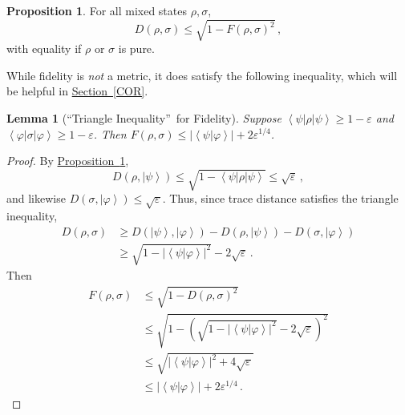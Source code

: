 \documentclass[10pt]{article}
\newtheorem{lemma}[theorem]{Lemma}
\theoremstyle{definition}
\newtheorem{proposition}[theorem]{Proposition}
\numberwithin{equation}{section}
\newcommand{\expref}[2]{\texorpdfstring{\hyperref[#2]{#1~\ref{#2}}}{#1~\ref{#2}}}
\begin{document}
\begin{proposition}
\label{ineq}For all mixed states $\rho,\sigma$,%
\[
D\left(  \rho,\sigma\right)  \leq\sqrt{1-F\left(  \rho,\sigma\right)  ^{2}}\,,
\]
with equality if $\rho$ or $\sigma$ is pure.
\end{proposition}

While fidelity is \emph{not} a metric, it does satisfy the following
inequality, which will be helpful in \expref{Section}{COR}.

\begin{lemma}
[\textquotedblleft Triangle Inequality\textquotedblright\ for Fidelity]%
\label{triangle}Suppose $\left\langle \psi\right\vert \rho\left\vert
\psi\right\rangle \geq1-\varepsilon$ and $\left\langle \varphi\right\vert
\sigma\left\vert \varphi\right\rangle \geq1-\varepsilon$. Then $F\left(
\rho,\sigma\right)  \leq\left\vert \left\langle \psi|\varphi\right\rangle
\right\vert +2\varepsilon^{1/4}$.
\end{lemma}

\begin{proof}
By \expref{Proposition}{ineq},%
\[
D\left(  \rho,\left\vert \psi\right\rangle \right)  \leq\sqrt{1-\left\langle
\psi\right\vert \rho\left\vert \psi\right\rangle }\leq\sqrt{\varepsilon}\,,
\]
and likewise $D\left(  \sigma,\left\vert \varphi\right\rangle \right)
\leq\sqrt{\varepsilon}$. Thus, since trace distance satisfies the triangle
inequality,%
\begin{align*}
D\left(  \rho,\sigma\right)   &  \geq D\left(  \left\vert \psi\right\rangle
,\left\vert \varphi\right\rangle \right)  -D\left(  \rho,\left\vert
\psi\right\rangle \right)  -D\left(  \sigma,\left\vert \varphi\right\rangle
\right)  \\
&  \geq\sqrt{1-\left\vert \left\langle \psi|\varphi\right\rangle \right\vert
^{2}}-2\sqrt{\varepsilon}\,.
\end{align*}
Then%
\begin{align*}
F\left(  \rho,\sigma\right)   &  \leq\sqrt{1-D\left(  \rho,\sigma\right)
^{2}}\\
&  \leq\sqrt{1-\left(  \sqrt{1-\left\vert \left\langle \psi|\varphi
\right\rangle \right\vert ^{2}}-2\sqrt{\varepsilon}\right)  ^{2}}\\
&  \leq\sqrt{\left\vert \left\langle \psi|\varphi\right\rangle \right\vert
^{2}+4\sqrt{\varepsilon}}\\[1ex]
&  \leq\left\vert \left\langle \psi|\varphi\right\rangle \right\vert
+2\varepsilon^{1/4}\,.
\end{align*}

\end{proof}
\setcounter{theorem}{6}
\end{document}
